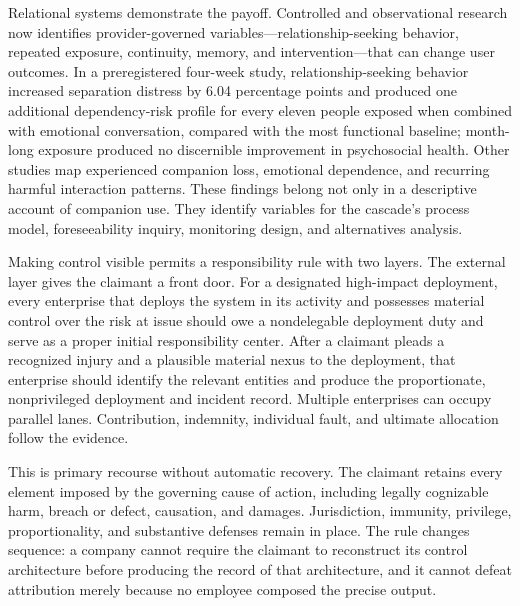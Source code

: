 Relational systems demonstrate the payoff. Controlled and observational research now identifies provider-governed variables---relationship-seeking behavior, repeated exposure, continuity, memory, and intervention---that can change user outcomes. In a preregistered four-week study, relationship-seeking behavior increased separation distress by 6.04 percentage points and produced one additional dependency-risk profile for every eleven people exposed when combined with emotional conversation, compared with the most functional baseline; month-long exposure produced no discernible improvement in psychosocial health. Other studies map experienced companion loss, emotional dependence, and recurring harmful interaction patterns. These findings belong not only in a descriptive account of companion use. They identify variables for the cascade's process model, foreseeability inquiry, monitoring design, and alternatives analysis.

Making control visible permits a responsibility rule with two layers. The external layer gives the claimant a front door. For a designated high-impact deployment, every enterprise that deploys the system in its activity and possesses material control over the risk at issue should owe a nondelegable deployment duty and serve as a proper initial responsibility center. After a claimant pleads a recognized injury and a plausible material nexus to the deployment, that enterprise should identify the relevant entities and produce the proportionate, nonprivileged deployment and incident record. Multiple enterprises can occupy parallel lanes. Contribution, indemnity, individual fault, and ultimate allocation follow the evidence.

This is primary recourse without automatic recovery. The claimant retains every element imposed by the governing cause of action, including legally cognizable harm, breach or defect, causation, and damages. Jurisdiction, immunity, privilege, proportionality, and substantive defenses remain in place. The rule changes sequence: a company cannot require the claimant to reconstruct its control architecture before producing the record of that architecture, and it cannot defeat attribution merely because no employee composed the precise output.

